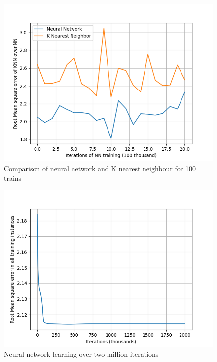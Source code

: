 \documentclass[11pt]{article}
\begin{document}
	\begin{figure}[!htb]
		\begin{center}
			\includegraphics{Resources/PartTwo/Comparison_20220116_050242.png}
			\caption{Comparison of neural network and K nearest neighbour for 100 trains}
			\label{Img:NNKNNCompB}
		\end{center}
	\end{figure}

\begin{figure}[!htb]
	\centering
	\includegraphics{Resources/PartTwo/FullTrainingData_20220116_050242_.png}
	\caption{Neural network learning over two million iterations}
	\label{Img:NNTrainD}
\end{figure}
	
\end{document}
